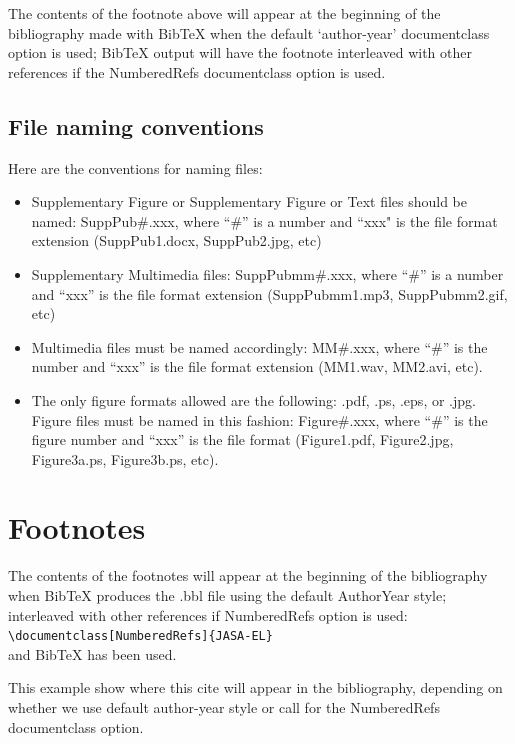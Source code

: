\documentclass{JASA-EL}
\begin{document}
The contents of the footnote above will appear at the beginning of the
bibliography made with BibTeX when the default `author-year' documentclass option is used;
BibTeX output will have the footnote interleaved with other
references if the NumberedRefs documentclass option is used.

\subsection{File naming conventions}
Here are the conventions for naming files:

\begin{itemize}
\item
Supplementary Figure or
	Supplementary Figure or Text files should be named: SuppPub\#.xxx, where ``\#'' is
	a number and ``xxx" is the file format extension
	(SuppPub1.docx, SuppPub2.jpg, etc)

\item
	Supplementary Multimedia files: SuppPubmm\#.xxx, where ``\#'' is a
	number and ``xxx'' is the file format extension (SuppPubmm1.mp3,
	SuppPubmm2.gif, etc)

\item
Multimedia files must be named accordingly: MM\#.xxx, where ``\#'' is the
number and ``xxx'' is the file format extension (MM1.wav, MM2.avi, etc).

\item
The only figure formats allowed are the following: 
.pdf, .ps, .eps, or .jpg. Figure files must be named in this fashion:
Figure\#.xxx, where ``\#'' is the figure number and ``xxx'' is the file format
(Figure1.pdf, Figure2.jpg, Figure3a.ps, Figure3b.ps, etc). 

\end{itemize}







\section{Footnotes}
The contents of the footnotes will appear at the beginning of the
bibliography when BibTeX produces the .bbl file using the default
AuthorYear style; interleaved with other references if 
Numbered\-Refs option is used:
\verb+\documentclass[NumberedRefs]{JASA-EL}+\\
and BibTeX has been used.

This example show where this cite \citep{booksamp1} will appear in the
bibliography,
depending on whether we use default author-year style
or call for the NumberedRefs documentclass option.
\end{document}
